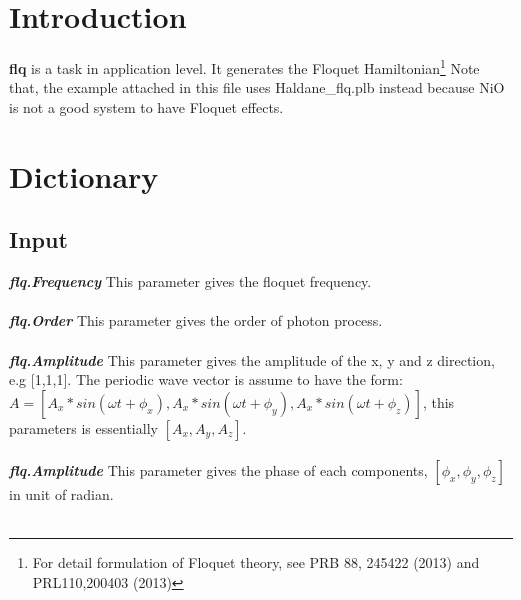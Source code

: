 \documentclass[10pt,a4paper]{article}
\begin{document}
\section{Introduction}
\textbf{flq} is a task in application level. It generates the Floquet Hamiltonian\footnote{For detail formulation of Floquet theory, see PRB 88, 245422 (2013) and PRL110,200403 (2013)} Note that, the example attached in this file uses Haldane\_flq.plb instead because NiO is not a good system to have Floquet effects.

\section{Dictionary}

\subsection{Input}
\textit{\textbf{flq.Frequency}} This parameter gives the floquet frequency. \\ \\
\textit{\textbf{flq.Order}} This parameter gives the order of photon process. \\ \\
\textit{\textbf{flq.Amplitude}} This parameter gives the amplitude of the x, y and z direction, e.g [1,1,1]. The periodic wave vector is assume to have the form: $A=[A_{x}*sin(\omega t+\phi_{x}),A_{x}*sin(\omega t+\phi_{y}),A_{x}*sin(\omega t+\phi_{z})]$, this parameters is essentially $[A_{x}, A_{y}, A_{z}]$. \\ \\
\textit{\textbf{flq.Amplitude}} This parameter gives the phase of each components, $[\phi_{x}, \phi_{y}, \phi_{z}]$ in unit of radian. \\ \\ 
\end{document}
